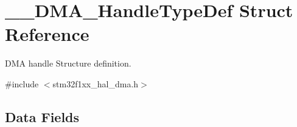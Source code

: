 \hypertarget{struct_____d_m_a___handle_type_def}{}\section{\+\_\+\+\_\+\+D\+M\+A\+\_\+\+Handle\+Type\+Def Struct Reference}
\label{struct_____d_m_a___handle_type_def}


D\+MA handle Structure definition.  




{\ttfamily \#include $<$stm32f1xx\+\_\+hal\+\_\+dma.\+h$>$}

\subsection*{Data Fields}

